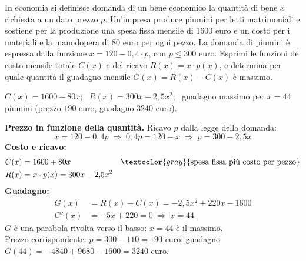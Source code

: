 \begin{question}[ID=1.2, subtitle={Massimizzare il guadagno nella produzione di piumini}, tags={ottimizzazione, economia}, difficulty=media]
In economia si definisce domanda di un bene economico la quantità di bene $x$ richiesta a un dato prezzo $p$.
Un'impresa produce piumini per letti matrimoniali e sostiene per la produzione una spesa fissa mensile di 1600 euro e un costo per i materiali e la manodopera di 80 euro per ogni pezzo. La domanda di piumini è espressa dalla funzione $x = 120 - 0{,}4 \cdot p$, con $p \le 300$ euro. Esprimi le funzioni del costo mensile totale $C(x)$ e del ricavo $R(x) = x \cdot p(x)$, e determina per quale quantità il guadagno mensile $G(x) = R(x) - C(x)$ è massimo.
\begin{solution}
$C(x)=1600+80x$; \ $R(x)=300x-2{,}5x^2$; \ guadagno massimo per $x=44$ piumini (prezzo $190$ euro, guadagno $3240$ euro).
\end{solution}
\begin{explanation}
\textbf{Prezzo in funzione della quantità.} Ricavo $p$ dalla legge della domanda:
\[ x=120-0{,}4p \;\Rightarrow\; 0{,}4p=120-x \;\Rightarrow\; p=300-2{,}5x \]
\textbf{Costo e ricavo:}
\[\begin{aligned}
C(x) &= 1600+80x && \textcolor{gray}{\text{spesa fissa più costo per pezzo}}\\
R(x) &= x\cdot p(x)=300x-2{,}5x^2
\end{aligned}\]
\textbf{Guadagno:}
\[\begin{aligned}
G(x) &= R(x)-C(x)=-2{,}5x^2+220x-1600\\
G'(x) &= -5x+220=0 \;\Rightarrow\; x=44
\end{aligned}\]
$G$ è una parabola rivolta verso il basso: $x=44$ è il massimo. \\
Prezzo corrispondente: $p=300-110=190$ euro; guadagno $G(44)=-4840+9680-1600=3240$ euro.
\end{explanation}
\end{question}


